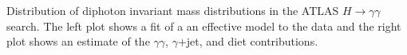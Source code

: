 Distribution of diphoton invariant mass distributions in the ATLAS $H\to\gamma\gamma$ search.  The left plot shows a fit of a an effective model to the data and the right plot shows an estimate of the $\gamma\gamma$, $\gamma$+jet, and diet contributions.